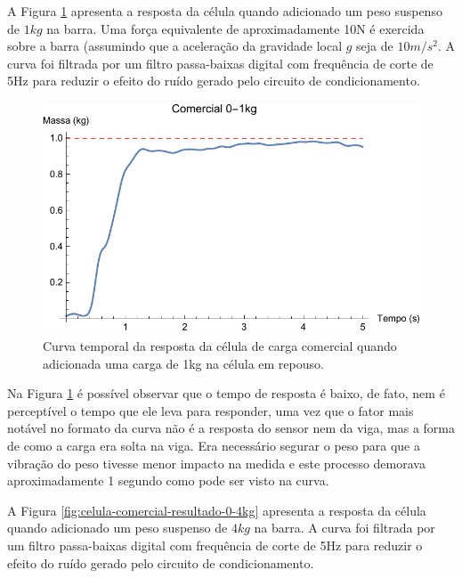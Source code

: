\documentclass[a4paper]{instrumentacao}
\begin{document}
A Figura \ref{fig:celula-comercial-resultado-0-1kg} apresenta a resposta da célula quando adicionado um peso suspenso  de $1 kg$ na barra. Uma força equivalente de aproximadamente 10N é exercida sobre a barra (assumindo que a aceleração da gravidade local $g$ seja de $10 m/s^2$. A curva foi filtrada por um filtro passa-baixas digital com frequência de corte de 5Hz para reduzir o efeito do ruído gerado pelo circuito de condicionamento.

\begin{figure}[H]
\center
\includegraphics[width=\textwidth]{Comercial_0-1kg.pdf}
\caption{Curva temporal da resposta da célula de carga comercial quando adicionada uma carga de 1kg na célula em repouso.}
\label{fig:celula-comercial-resultado-0-1kg}
\end{figure}

Na Figura \ref{fig:celula-comercial-resultado-0-1kg} é possível observar que o tempo de resposta é baixo, de fato, nem é perceptível o tempo que ele leva para responder, uma vez que o fator mais notável no formato da curva não é a resposta do sensor nem da viga, mas a forma de como a carga era solta na viga. Era necessário segurar o peso para que a vibração do peso tivesse menor impacto na medida e este processo demorava aproximadamente 1 segundo como pode ser visto na curva.

A Figura \ref{fig:celula-comercial-resultado-0-4kg} apresenta a resposta da célula quando adicionado um peso suspenso de $4 kg$ na barra. A curva foi filtrada por um filtro passa-baixas digital com frequência de corte de 5Hz para reduzir o efeito do ruído gerado pelo circuito de condicionamento.
\end{document}
